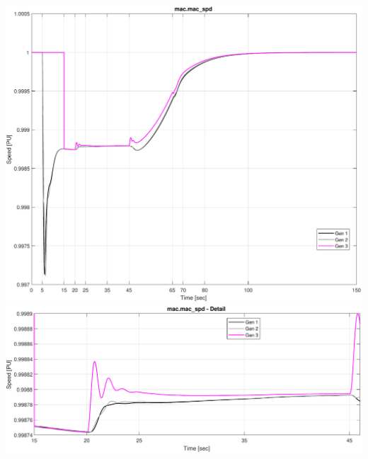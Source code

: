 \pagebreak
\includegraphics[width=\linewidth]{examples/untrip/combinedSpeed}
\includegraphics[width=\linewidth]{examples/untrip/combinedSpeedDetail}


